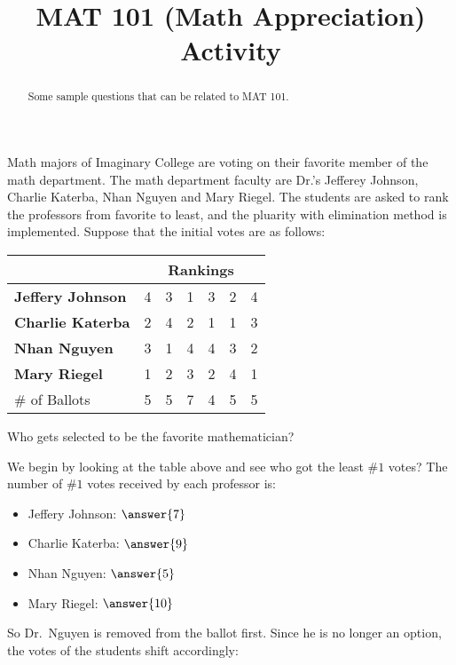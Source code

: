 \documentclass{ximera}
\title{MAT 101 (Math Appreciation) Activity}
\begin{document}
      
\begin{abstract}
      
Some sample questions that can be related to MAT 101.
      
\end{abstract}
      
\maketitle
      
      
      
\begin{question}
Math majors of Imaginary College are voting on their favorite member of the math department.  The math department faculty are Dr.'s Jefferey Johnson, Charlie Katerba, Nhan Nguyen and Mary Riegel.  The students are asked to rank the professors from favorite to least, and the pluarity with elimination method is implemented.  Suppose that the initial votes are as follows:

\begin{tabular}{|l|c|c|c|c|c|c|}
\multicolumn{1}{c}{}& \multicolumn{6}{c}{\textbf{Rankings}}\\
\hline
\textbf{Jeffery Johnson} &4 &3 &1 &3&2&4\\
\textbf{Charlie Katerba} &2 &4 &2 &1&1&3\\
\textbf{Nhan Nguyen}    &3 &1 &4 &4&3&2\\
\textbf{Mary Riegel}       &1 &2 &3 &2&4&1\\
\hline
\# of Ballots                       &5 & 5 &  7 & 4&5&5\\
\hline
\end{tabular}
Who gets selected to be the favorite mathematician?

\begin{explanation}
We begin by looking at the table above and see who got the least $\#1$ votes?  The number of $\#1$ votes received by each professor is:

\begin{itemize}
\item Jeffery Johnson: $\answer{7}$
\item Charlie Katerba: $\answer{9}$
\item Nhan Nguyen: $\answer{5}$
\item Mary Riegel: $\answer{10}$
\end{itemize}

So Dr.\ Nguyen is removed from the ballot first.  Since he is no longer an option, the votes of the students shift accordingly:


\end{explanation}
\end{question}
\end{document}
